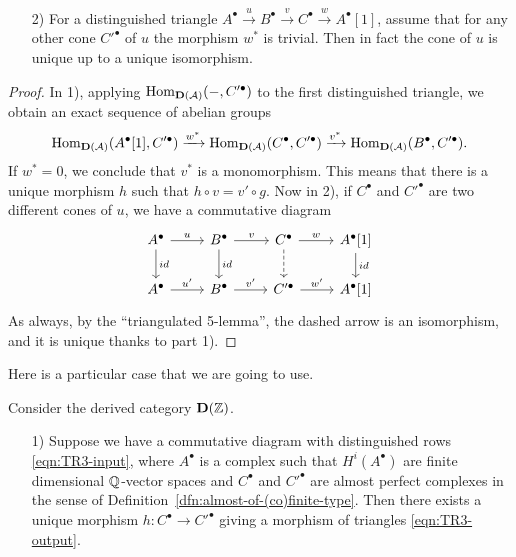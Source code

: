 \documentclass{article}
\numberwithin{equation}{section}
\begin{document}
\begin{appendices}
\begin{lemma}
\begin{enumerate}
  \item[2)] For a distinguished triangle
    $A^\bullet \xrightarrow{u} B^\bullet \xrightarrow{v} C^\bullet \xrightarrow{w} A^\bullet[1]$,
    assume that for any other cone $C'^\bullet$
    of $u$ the morphism $w^*$ is trivial. Then in fact the cone of $u$ is unique
    up to a unique isomorphism.
  \end{enumerate}

  \begin{proof}
    In 1), applying $\operatorname{Hom}_{\mathbf{D} (\mathcal{A})} (-, C'^\bullet)$ to the
    first distinguished triangle, we obtain an exact sequence of abelian groups
    \[ \operatorname{Hom}_{\mathbf{D} (\mathcal{A})} (A^\bullet [1], C'^\bullet) \xrightarrow{w^*}
    \operatorname{Hom}_{\mathbf{D} (\mathcal{A})} (C^\bullet, C'^\bullet) \xrightarrow{v^*}
    \operatorname{Hom}_{\mathbf{D} (\mathcal{A})} (B^\bullet, C'^\bullet). \]
    If $w^* = 0$, we conclude that $v^*$ is a monomorphism. This means that
    there is a unique morphism $h$ such that $h\circ v = v'\circ g$. Now in 2),
    if $C^\bullet$ and $C'^\bullet$ are two different cones of $u$, we have a
    commutative diagram
    \[ \begin{tikzcd}
      A^\bullet\ar{r}{u}\ar{d}{id} & B^\bullet\ar{r}{v}\ar{d}{id} & C^\bullet\ar{r}{w}\ar[dashed]{d} & A^\bullet [1]\ar{d}{id} \\
      A^\bullet\ar{r}{u'} & B^\bullet\ar{r}{v'} & C'^\bullet\ar{r}{w'} & A^\bullet [1]
    \end{tikzcd} \]
    As always, by the ``triangulated 5-lemma'', the dashed arrow is an
    isomorphism, and it is unique thanks to part 1).
  \end{proof}
\end{lemma}

Here is a particular case that we are going to use.

\begin{corollary}
  \label{TR3-TR1-with-uniqueness}
  Consider the derived category $\mathbf{D} (\mathbb{Z})$.

  \begin{enumerate}
  \item[1)] Suppose we have a commutative diagram with distinguished rows
    \eqref{eqn:TR3-input}, where $A^\bullet$ is a complex such that
    $H^i (A^\bullet)$ are finite dimensional $\mathbb{Q}$-vector spaces and
    $C^\bullet$ and $C'^\bullet$ are almost perfect complexes in the sense of
    Definition~\ref{dfn:almost-of-(co)finite-type}. Then there exists a unique
    morphism ${h\colon C^\bullet \to C'^\bullet}$ giving a morphism of triangles
    \eqref{eqn:TR3-output}.


\end{enumerate}
\end{corollary}
\end{appendices}
\end{document}
